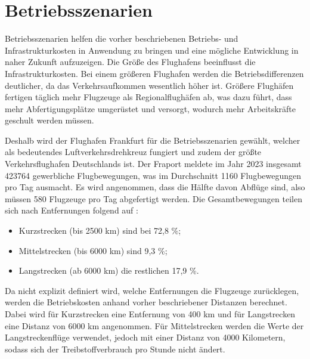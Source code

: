 
\section{Betriebsszenarien}
\label{s:Betriebsszenarien}
Betriebsszenarien helfen die vorher beschriebenen Betriebs- und Infrastrukturkosten 
in Anwendung zu bringen und eine mögliche Entwicklung in naher Zukunft aufzuzeigen. 
Die Größe des Flughafens beeinflusst die Infrastrukturkosten. 
Bei einem größeren Flughafen werden die Betriebsdifferenzen deutlicher, 
da das Verkehrsaufkommen wesentlich höher ist.
Größere Flughäfen fertigen täglich mehr Flugzeuge als Regionalflughäfen ab, 
was dazu führt, dass mehr Abfertigungsplätze umgerüstet und versorgt,
wodurch mehr Arbeitskräfte geschult werden müssen.

Deshalb wird der Flughafen Frankfurt für die Betriebsszenarien gewählt,
welcher als bedeutendes Luftverkehrsdrehkreuz fungiert
und zudem der größte Verkehrsflughafen Deutschlands ist.
Der Fraport meldete im Jahr 2023 insgesamt 423764 gewerbliche Flugbewegungen, 
was im Durchschnitt 1160 Flugbewegungen pro Tag ausmacht. 
Es wird angenommen, dass die Hälfte davon Abflüge sind, 
also müssen 580 Flugzeuge pro Tag abgefertigt werden.
%
Die Gesamtbewegungen teilen sich nach Entfernungen folgend auf \cite{fraport2023frankfurt}:
\begin{itemize}
    \item Kurzstrecken (bis 2500 km) sind bei 72,8 \%;
    \item Mittelstrecken (bis 6000 km) sind 9,3 \%;
    \item Langstrecken (ab 6000 km) die restlichen 17,9 \%. 
    \end{itemize}
Da nicht explizit definiert wird, welche Entfernungen die Flugzeuge zurücklegen, 
werden die Betriebskosten anhand vorher beschriebener Distanzen berechnet.
Dabei wird für Kurzstrecken eine Entfernung von 400 km 
und für Langstrecken eine Distanz von 6000 km angenommen.
Für Mittelstrecken werden die Werte der Langstreckenflüge verwendet, 
jedoch mit einer Distanz von 4000 Kilometern, 
sodass sich der Treibstoffverbrauch pro Stunde nicht ändert.

